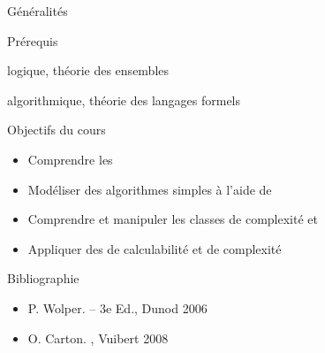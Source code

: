 
\begingroup

\begin{frame}{Généralités}

  \begin{block}{Prérequis}
    \begin{description}[Mathématiques : ]
    \item[Mathématiques : ] logique, théorie des ensembles
    \item[Informatique : ] algorithmique, théorie des langages formels
    \end{description}
  \end{block}

  \begin{block}{Objectifs du cours}
    \begin{itemize}
    \item Comprendre les 
    \item Modéliser des algorithmes simples à l’aide de 
    \item Comprendre et manipuler les classes de complexité  et 
    \item Appliquer des  de calculabilité et de complexité
    \end{itemize}
  \end{block}

  \begin{block}{Bibliographie}
    \begin{itemize}
    \item P. Wolper.  -- 3e Ed., Dunod 2006
    \item O. Carton. , Vuibert 2008
    \end{itemize}
  \end{block}
  
\end{frame}

\endgroup
\endinput
